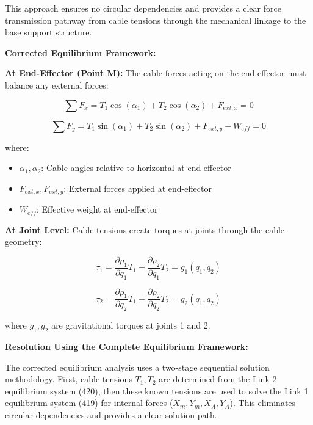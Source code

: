 This approach ensures no circular dependencies and provides a clear force transmission pathway from cable tensions through the mechanical linkage to the base support structure.

\textbf{Corrected Equilibrium Framework:}

\textbf{At End-Effector (Point M):}
The cable forces acting on the end-effector must balance any external forces:

\begin{equation}
\sum F_x = T_1 \cos(\alpha_1) + T_2 \cos(\alpha_2) + F_{ext,x} = 0
\end{equation}

\begin{equation}
\sum F_y = T_1 \sin(\alpha_1) + T_2 \sin(\alpha_2) + F_{ext,y} - W_{eff} = 0
\end{equation}

where:
\begin{itemize}
    \item $\alpha_1, \alpha_2$: Cable angles relative to horizontal at end-effector
    \item $F_{ext,x}, F_{ext,y}$: External forces applied at end-effector  
    \item $W_{eff}$: Effective weight at end-effector
\end{itemize}

\textbf{At Joint Level:}
Cable tensions create torques at joints through the cable geometry:

\begin{equation}
\tau_1 = \frac{\partial \rho_1}{\partial q_1} T_1 + \frac{\partial \rho_2}{\partial q_1} T_2 = g_1(q_1, q_2)
\end{equation}

\begin{equation}
\tau_2 = \frac{\partial \rho_1}{\partial q_2} T_1 + \frac{\partial \rho_2}{\partial q_2} T_2 = g_2(q_1, q_2)
\end{equation}

where $g_1, g_2$ are gravitational torques at joints 1 and 2.

\textbf{Resolution Using the Complete Equilibrium Framework:}

The corrected equilibrium analysis uses a two-stage sequential solution methodology. First, cable tensions $T_1, T_2$ are determined from the Link 2 equilibrium system (420), then these known tensions are used to solve the Link 1 equilibrium system (419) for internal forces ($X_m, Y_m, X_A, Y_A$). This eliminates circular dependencies and provides a clear solution path.

